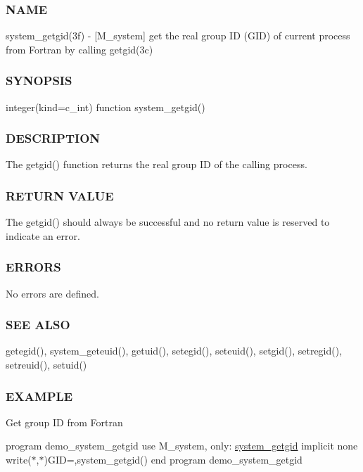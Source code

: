 \subsubsection*{N\+A\+ME}

system\+\_\+getgid(3f) -\/ \mbox{[}M\+\_\+system\mbox{]} get the real group ID (G\+ID) of current process from Fortran by calling getgid(3c) \subsubsection*{S\+Y\+N\+O\+P\+S\+IS}

integer(kind=c\+\_\+int) function system\+\_\+getgid() \subsubsection*{D\+E\+S\+C\+R\+I\+P\+T\+I\+ON}

The getgid() function returns the real group ID of the calling process.

\subsubsection*{R\+E\+T\+U\+RN V\+A\+L\+UE}

The getgid() should always be successful and no return value is reserved to indicate an error.

\subsubsection*{E\+R\+R\+O\+RS}

No errors are defined.

\subsubsection*{S\+EE A\+L\+SO}

getegid(), system\+\_\+geteuid(), getuid(), setegid(), seteuid(), setgid(), setregid(), setreuid(), setuid()

\subsubsection*{E\+X\+A\+M\+P\+LE}

Get group ID from Fortran

program demo\+\_\+system\+\_\+getgid use M\+\_\+system, only\+: \hyperlink{interfacem__system_1_1system__getgid}{system\+\_\+getgid} implicit none write($\ast$,$\ast$)\textquotesingle{}G\+ID=\textquotesingle{},system\+\_\+getgid() end program demo\+\_\+system\+\_\+getgid \mbox{\label{namespacem__system_a7246c40d96a190aabdd8a002c963c2d0}} 
